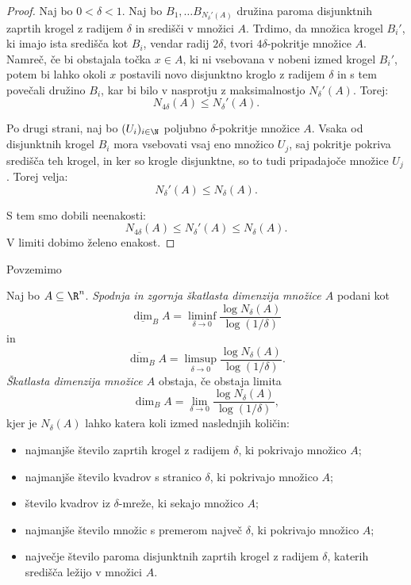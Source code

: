 \begin{proof}
    Naj bo \(0 < \delta < 1\). Naj bo \(B_1, \ldots B_{N_\delta'(A)}\) družina paroma disjunktnih zaprtih krogel z radijem \(\delta\) in središči v množici \(A\). Trdimo, da množica krogel \(B_i'\), ki imajo ista središča kot \(B_i\), vendar radij \(2\delta\), tvori \(4\delta\)-pokritje množice \(A\). Namreč, če bi obstajala točka \(x \in A\), ki ni vsebovana v nobeni izmed krogel \(B_i'\), potem bi lahko okoli \(x\) postavili novo disjunktno kroglo z radijem \(\delta\) in s tem povečali družino \(B_i\), kar bi bilo v nasprotju z maksimalnostjo \(N_\delta'(A)\). Torej:
    \[
    N_{4\delta}(A) \leq N_\delta'(A).
    \]

    Po drugi strani, naj bo \((U_i)_{i \in \N}\) poljubno \(\delta\)-pokritje množice \(A\). Vsaka od disjunktnih krogel \(B_i\) mora vsebovati vsaj eno množico \(U_j\), saj pokritje pokriva središča teh krogel, in ker so krogle disjunktne, so to tudi pripadajoče množice \(U_j\). Torej velja:
    \[
    N_\delta'(A) \leq N_\delta(A).
    \]

    S tem smo dobili neenakosti:
    \[
    N_{4\delta}(A) \leq N_\delta'(A) \leq N_\delta(A).
    \]
    V limiti dobimo želeno enakost.
\end{proof}


Povzemimo
\begin{definicija}
    Naj bo \(A \subseteq \R^n\).
    \emph{Spodnja in zgornja škatlasta dimenzija množice \(A\)} podani kot 
    \[
    \underline{\dim}_B A = \liminf_{\delta \to 0} \frac{\log N_\delta(A)}{\log(1/\delta)}
    \]
    in 
    \[
    \overline{\dim}_B A = \limsup_{\delta \to 0} \frac{\log N_\delta(A)}{\log(1/\delta)}.
    \]     
    \emph{Škatlasta dimenzija množice \(A\)} obstaja, če obstaja limita
    \[
    \dim_B A = \lim_{\delta \to 0} \frac{\log N_\delta(A)}{\log(1/\delta)},
    \] 
    kjer je \(N_\delta(A)\) lahko katera koli izmed naslednjih količin:
    \begin{itemize}
        \item najmanjše število zaprtih krogel z radijem \(\delta\), ki pokrivajo množico \(A\);
        \item najmanjše število kvadrov s stranico \(\delta\), ki pokrivajo množico \(A\);
        \item število kvadrov iz \(\delta\)-mreže, ki sekajo množico \(A\);
        \item najmanjše število množic s premerom največ \(\delta\), ki pokrivajo množico \(A\);
        \item največje število paroma disjunktnih zaprtih krogel z radijem \(\delta\), katerih središča ležijo v množici \(A\).
    \end{itemize}
\end{definicija}

